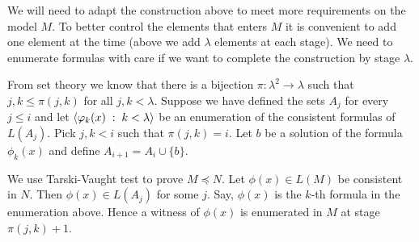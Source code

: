 \documentclass[creche.tex]{subfiles}
\begin{document}
We will need to adapt the construction above to meet more requirements on the model $M$.
To better control the elements that enters $M$ it is convenient to add one element at the time (above we add $\lambda$ elements at each stage).
We need to enumerate formulas with care if we want to complete the construction by stage $\lambda$.

% 


\begin{void_thm}\label{diym_II_lowenheimskolemallingiu}\rm
From set theory we know that there is a bijection $\pi:\lambda^2\to\lambda$ such that $j,k\le\pi(j,k)$ for all $j,k<\lambda$.
Suppose we have defined the sets $A_j$ for every $j\le i$ and let $\langle\varphi_k(x)\;:\;k<\lambda\rangle$ be an enumeration of the consistent formulas of $L(A_j)$. Pick $j,k<i$ such that $\pi(j,k)=i$.
Let $b$ be a solution of the formula $\phi_k(x)$ and define $A_{i+1}=A_i\cup\{b\}$.

We use Tarski-Vaught test to prove $M\preceq N$.
Let $\phi(x)\in L(M)$ be consistent in $N$.
Then $\phi(x)\in L(A_j)$ for some $j$. Say, $\phi(x)$ is the $k$-th formula in the enumeration above.
Hence a witness of $\phi(x)$ is enumerated in $M$ at stage $\pi(j,k)+1$.\QED
\end{void_thm}

\end{document}
